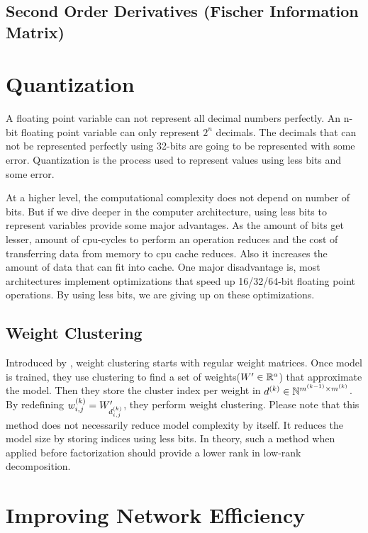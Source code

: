 \subsection{Second Order Derivatives (Fischer Information Matrix)}
\fi

\section{Quantization}
A floating point variable can not represent all decimal numbers perfectly. An n-bit floating point variable can only represent $2^{n}$ decimals. The decimals that can not be represented perfectly using 32-bits are going to be represented with some error. Quantization is the process used to represent values using less bits and some error. 

At a higher level, the computational complexity does not depend on number of bits. But if we dive deeper in the computer architecture, using less bits to represent variables provide some major advantages. As the amount of bits get lesser, amount of cpu-cycles to perform an operation reduces and the cost of transferring data from memory to cpu cache reduces. Also it increases the amount of data that can fit into cache. One major disadvantage is, most architectures implement optimizations that speed up 16/32/64-bit floating point operations. By using less bits, we are giving up on these optimizations. 

\subsection{Weight Clustering}
Introduced by \cite{nowlan1992simplifying}, weight clustering starts with regular weight matrices. Once model is trained, they use clustering to find a set of weights($\all\weights' \inreal{a}$) that approximate the model. Then they store the cluster index per weight in $d^{(k)} \in \mathbb{N}^{m^{(k-1)} \times m^{(k)}}$. By redefining $\wk{k}_{i,j} = \all\weights'_{d^{(k)}_{i,j}}$, they perform weight clustering. Please note that this method does not necessarily reduce model complexity by itself. It reduces the model size by storing indices using less bits. In theory, such a method when applied before factorization should provide a lower rank in low-rank decomposition. 

\section{Improving Network Efficiency}

